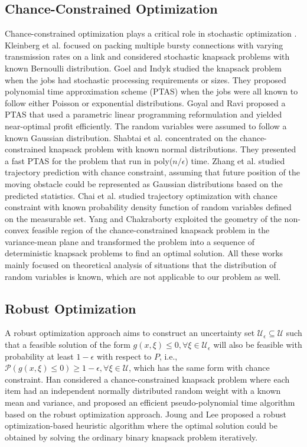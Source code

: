 \documentclass[lettersize,journal]{IEEEtran}
\begin{document}
\subsection{Chance-Constrained Optimization}
Chance-constrained optimization plays a critical role in stochastic optimization \cite{delage2010percentile,doerr2020optimization,shapiro2021lectures}. 
Kleinberg et al. \cite{kleinberg1997allocating} focused on packing multiple bursty connections with varying transmission rates on a link and considered stochastic knapsack problems with known Bernoulli distribution. 
Goel and Indyk \cite{goel1999stochastic} studied the knapsack problem when the jobs had stochastic processing requirements or sizes. They proposed polynomial time approximation scheme (PTAS) when the jobs were all known to follow either Poisson or exponential distributions. 
Goyal and Ravi\cite{goyal2010ptas} proposed a PTAS that used a parametric linear programming reformulation and yielded near-optimal profit efficiently. The random variables were assumed to follow a known Gaussian distribution. 
Shabtai et al. \cite{shabtai2018relaxed} concentrated on the chance-constrained knapsack problem with known normal distributions. They presented a fast PTAS for the problem that run in poly($n/\epsilon$) time. 
Zhang et al. \cite{8637163} studied trajectory prediction with chance constraint, assuming that  future position of the moving obstacle could be represented as Gaussian distributions based on the predicted statistics.
Chai et al. \cite{9269349} studied trajectory optimization with chance constraint with known probability density function of random variables defined on the measurable set.
Yang and Chakraborty \cite{yang2018algorithm} exploited the geometry of the non-convex feasible region of the chance-constrained knapsack problem in the variance-mean plane and transformed the problem into a sequence of deterministic knapsack problems to find an optimal solution.
All these works mainly focused on theoretical analysis of situations that the distribution of random variables is known, which are not applicable to our problem as well.

\subsection{Robust Optimization}
\label{subsection:ro}
A robust optimization approach aims to construct an uncertainty set $\mathcal{U}_{\epsilon}\subseteq \mathcal{U}$ such that a feasible solution of the form $g(x,\xi)\leq 0, \forall \xi \in \mathcal{U}_{\epsilon}$ will also be feasible with probability at least $1-\epsilon$ with respect to $P$, i.e., $\mathcal{P}(g(x,\xi)\leq 0)\geq 1-\epsilon, \forall \xi \in \mathcal{U}$, which has the same form with chance constraint. 
Han \cite{han2016robust} considered a chance-constrained knapsack problem where each item had an independent normally distributed random weight with a known mean and variance, and proposed an efficient pseudo-polynomial time algorithm based on the robust optimization approach. 
Joung and Lee\cite{joung2020robust} proposed a robust optimization-based heuristic algorithm where the optimal solution could be obtained by solving the ordinary binary knapsack problem iteratively. 
\end{document}
